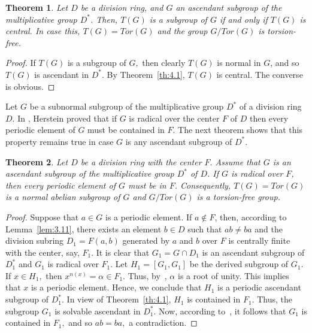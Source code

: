 \documentclass{amsart}
\newtheorem{theorem}{Theorem}[section]
\theoremstyle{definition}
\begin{document}
\begin{theorem}\label{th4.2} Let $D$ be a division ring, and $G$ an ascendant subgroup of the multiplicative group $D^*$. Then, $T(G)$ is a subgroup of $G$ if and only if $T(G)$ is central. In case this, $T(G)=\mathit{Tor}(G)$ and the group $G/\mathit{Tor}(G)$ is torsion-free.
\end{theorem}
\begin{proof}
If $T(G)$ is a subgroup of $G,$ then clearly $T(G)$ is normal in $G$, and so $T(G)$ is ascendant in $D^*$. By Theorem~\ref{th:4.1}, $T(G)$ is central. The converse is obvious.
\end{proof}

Let $G$ be a subnormal subgroup of the multiplicative group $D^*$ of a division ring $D$. In \cite[Theorem 9]{Pa_Herstein_1978}, Herstein proved that if $G$ is radical over the center $F$ of $D$ then every periodic element of $G$ must be contained in $F$. The next theorem shows that this property remains true in case $G$ is any ascendant subgroup of $D^*$.

\begin{theorem}\label{th:4.3} Let $D$ be a division ring with the center $F.$ Assume that $G$ is an ascendant subgroup of the multiplicative group $D^*$ of $D$. If $G$ is radical over $F$, then every periodic element of $G$ must be in $F$. Consequently, $T(G)=Tor(G)$ is a normal abelian subgroup of $G$ and $G/Tor(G)$ is a torsion-free group.
\end{theorem}
\begin{proof} Suppose that $a\in G$ is a periodic element. If $a\notin F$, then, according to Lemma~\ref{lem:3.11}, there exists an element $b\in D$ such that $ab\ne ba$ and the division subring $D_1=F(a,b)$ generated by $a$ and $b$ over $F$ is centrally finite with the center, say, $F_1$. It is clear that $G_1=G\cap D_1$ is an ascendant subgroup of $D_1^*$ and $G_1$ is radical over $F_1.$ Let $H_1=[G_1,G_1]$ be the derived subgroup of $G_1.$ If $x\in H_1,$ then $x^{n(x)}=\alpha\in F_1.$ Thus, by~\cite[Sublemma]{Pa_Herstein_1978}, $\alpha$ is a root of unity. This implies that $x$ is a periodic element. Hence, we conclude that $H_1$ is a periodic ascendant subgroup of $D_1^*.$ In view of Theorem~\ref{th:4.1}, $H_1$ is contained in $F_1.$ Thus, the subgroup $G_1$ is solvable ascendant in $D_1^*$. Now, according to~\cite[Theorem 3.8]{Pa_ChuaHai_2026}, it follows that $G_1$ is contained in $F_1,$ and so $ab=ba,$ a contradiction.
\end{proof}	
\end{document}
